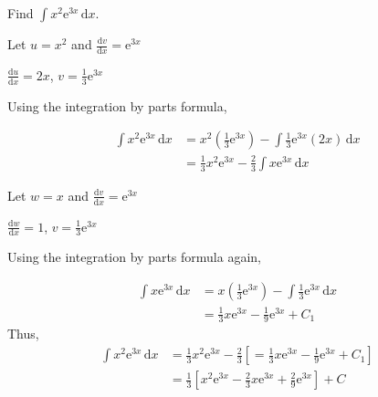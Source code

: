 \documentclass[11pt,a4paper]{book}
\begin{document}
\begin{example}

Find ${\displaystyle \int x^{2}\mathrm{e}^{3x}\, \mathrm{d}x}$.

\medskip

\Solution

Let $u=x^{2}$ and ${\displaystyle \frac{\mathrm{d}v}{\mathrm{d}x}=\mathrm{e}^{3x}}$

\hspace{0.26cm} ${\displaystyle \frac{\mathrm{d}u}{\mathrm{d}x}=2x}$, \hspace{0.73cm}
${\displaystyle v=\frac{1}{3}\mathrm{e}^{3x}}$

\medskip

Using the integration by parts formula,

\medskip

\begin{align*}
\int x^{2}\mathrm{e}^{3x}\, \mathrm{d}x & =x^{2}\left(\frac{1}{3}\mathrm{e}^{3x}\right)-\int\frac{1}{3}\mathrm{e}^{3x}(2x)\, \mathrm{d}x\\
 & =\frac{1}{3}x^{2}\mathrm{e}^{3x}-\frac{2}{3}\int x\mathrm{e}^{3x}\, \mathrm{d}x
\end{align*}

Let $w=x$ and ${\displaystyle \frac{\mathrm{d}v}{\mathrm{d}x}=\mathrm{e}^{3x}}$

\hspace{0.26cm} ${\displaystyle \frac{\mathrm{d}w}{\mathrm{d}x}=1}$, \hspace{0.75cm}
${\displaystyle v=\frac{1}{3}\mathrm{e}^{3x}}$

\medskip

Using the integration by parts formula again,

\medskip

\begin{align*}
\int x\mathrm{e}^{3x}\, \mathrm{d}x & =x\left(\frac{1}{3}\mathrm{e}^{3x}\right)-\int\frac{1}{3}\mathrm{e}^{3x}\, \mathrm{d}x\\
 & =\frac{1}{3}x\mathrm{e}^{3x}-\frac{1}{9}\mathrm{e}^{3x}+C_{1}
\end{align*}
Thus,
\begin{align*}
\int x^{2}\mathrm{e}^{3x}\, \mathrm{d}x & =\frac{1}{3}x^{2}\mathrm{e}^{3x}-\frac{2}{3}\left[=\frac{1}{3}x\mathrm{e}^{3x}-\frac{1}{9}\mathrm{e}^{3x}+C_{1}\right]\\
 & =\frac{1}{3}\left[x^{2}\mathrm{e}^{3x}-\frac{2}{3}x\mathrm{e}^{3x}+\frac{2}{9}\mathrm{e}^{3x}\right]+C
\end{align*}

\end{example}
\end{document}
